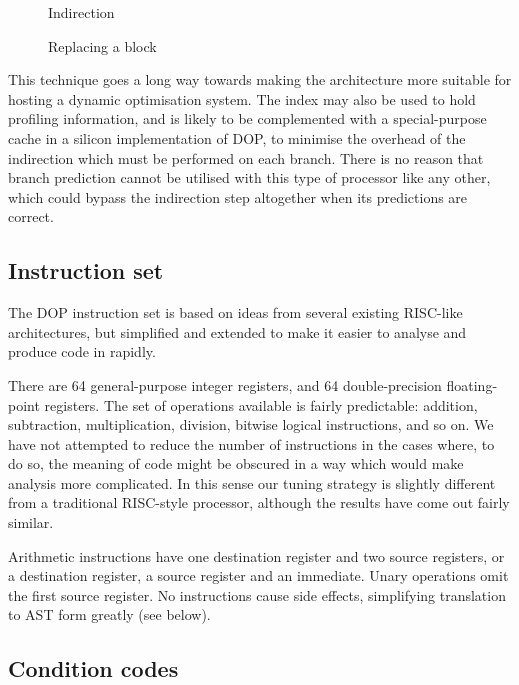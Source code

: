 \documentclass[11pt,letterpaper,twocolumn,notitlepage]{article}
\begin{document}
\begin{figure}[t]
\centerline{}
\caption{\label{indir-1}Indirection}
\end{figure}

\begin{figure}[t]
\centerline{}
\caption{\label{indir-2}Replacing a block}
\end{figure}

This technique goes a long way towards making the architecture more suitable for hosting a dynamic optimisation system. The index may also be used to hold profiling information, and is likely to be complemented with a special-purpose cache in a silicon implementation of DOP, to minimise the overhead of the indirection which must be performed on each branch. There is no reason that branch prediction cannot be utilised with this type of processor like any other, which could bypass the indirection step altogether when its predictions are correct.

\subsection{Instruction set}

The DOP instruction set is based on ideas from several existing RISC-like architectures, but simplified and extended to make it easier to analyse and produce code in rapidly.

There are 64 general-purpose integer registers, and 64 double-precision floating-point registers. The set of operations available is fairly predictable: addition, subtraction, multiplication, division, bitwise logical instructions, and so on. We have not attempted to reduce the number of instructions in the cases where, to do so, the meaning of code might be obscured in a way which would make analysis more complicated. In this sense our tuning strategy is slightly different from a traditional RISC-style processor, although the results have come out fairly similar.

Arithmetic instructions have one destination register and two source registers, or a destination register, a source register and an immediate. Unary operations omit the first source register. No instructions cause side effects, simplifying translation to AST form greatly (see below).

\subsection{Condition codes}
\end{document}

